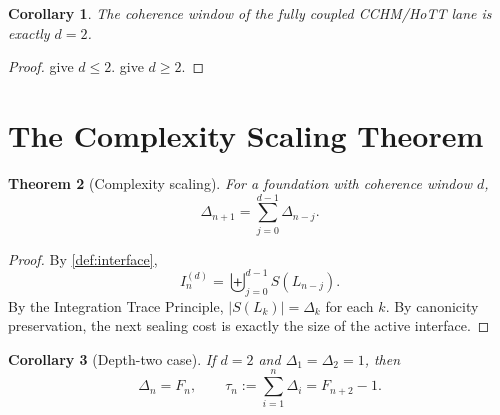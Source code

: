 \documentclass[11pt,a4paper]{article}
\theoremstyle{plain}
\newtheorem{theorem}{Theorem}[section]
\newtheorem{corollary}[theorem]{Corollary}
\theoremstyle{definition}
\theoremstyle{remark}
\begin{document}
\begin{corollary}
\label{cor:d-two}
The coherence window of the fully coupled CCHM/HoTT lane is exactly $d=2$.
\end{corollary}

\begin{proof}
 give $d\le 2$.   give $d\ge 2$.
\end{proof}

\section{The Complexity Scaling Theorem}
\label{sec:scaling}

\begin{theorem}[Complexity scaling]
\label{thm:scaling}
For a foundation with coherence window $d$,
\[
  \Delta_{n+1}=\sum_{j=0}^{d-1}\Delta_{n-j}.
\]
\end{theorem}

\begin{proof}
By \cref{def:interface},
\[
  I_n^{(d)}=\biguplus_{j=0}^{d-1}S(L_{n-j}).
\]
By the Integration Trace Principle, $|S(L_k)|=\Delta_k$ for each $k$.  By canonicity preservation, the next sealing cost is exactly the size of the active interface.
\end{proof}

\begin{corollary}[Depth-two case]
\label{cor:fibonacci}
If $d=2$ and $\Delta_1=\Delta_2=1$, then
\[
  \Delta_n=F_n,
  \qquad
  \tau_n:=\sum_{i=1}^n\Delta_i=F_{n+2}-1.
\]
\end{corollary}
\end{document}
